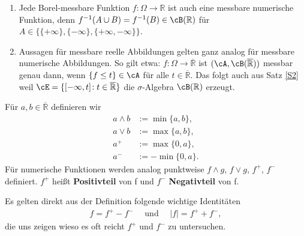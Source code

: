 \begin{bem}\abs
	\begin{enumerate}[label=(\roman*)]
		\item Jede Borel-messbare Funktion $f \! : \Omega \rightarrow \mathbb{R}$ ist auch eine messbare numerische Funktion, denn $f^{-1} (A \cup B) = f^{-1}(B) \in \cB(\mathbb{R}) $ für $A \in \{ \{+\infty\}, \{-\infty\}, \{+\infty,-\infty\} \}$.
		\item Aussagen für messbare reelle Abbildungen gelten ganz analog für messbare numerische Abbildungen. So gilt etwa: $f \! : \Omega \rightarrow \overline{\mathbb{R}}$ ist $(\cA, \cB(\mathbb{\overline R}))$ messbar genau dann, wenn $\{ f \leq t \} \in \cA$ f\"ur alle $t \in \overline{\mathbb{R}}$. Das folgt auch aus Satz \ref{S2} weil $\cE = \{ [-\infty,t] \! : t \in \overline{\mathbb{R}} \}$ die $\sigma$-Algebra $\cB(\mathbb{R})$ erzeugt.
	\end{enumerate}
\end{bem}

\begin{deff}
	Für $a,b \in \overline{\mathbb{R}}$ definieren wir
	\begin{align*}
		a \land b &:= \min\{ a,b \},\\
		a \lor b &:= \max\{ a,b \},\\
		a^{+} &:= \max\{ 0, a \},\\
		a^{-} &:= -\min\{ 0, a \}.
	\end{align*}
	F\"ur numerische Funktionen werden analog punktweise  $f \land g$, $f \lor g$, $f^{+}$, $f^{-}$ definiert. $f^{+}$ heißt \textbf{Positivteil} von f und $f^{-}$ \textbf{Negativteil} von f.
\end{deff}
Es gelten direkt aus der Definition folgende wichtige Identit\"aten
\begin{align*}
	f = f^{+} - f^{-}\quad \text{ und }\quad |f| = f^{+} + f^{-},
\end{align*}
die uns zeigen wieso es oft reicht $f^+$ und $f^-$ zu untersuchen.